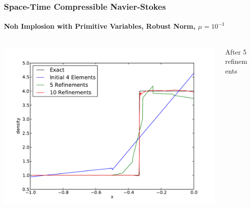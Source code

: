 \documentclass[18pt,xcolor=table]{beamer}
\begin{document}
%                                
%                                
% 
\begin{frame}[t]
\frametitle{Space-Time Compressible Navier-Stokes}
\framesubtitle{Noh Implosion with Primitive Variables, Robust Norm, $\mu=10^{-3}$}  %

\begin{columns}[t]
\begin{column}[c]{0.7\textwidth}
\centering
\includegraphics[width=1.05\textwidth]{Dissertation/Noh/Robust-den.pdf}
\end{column}
\begin{column}[c]{0.28\textwidth}
\centering
After 5 refinements\\

\end{column}
\end{columns}
\end{frame}
\end{document}
